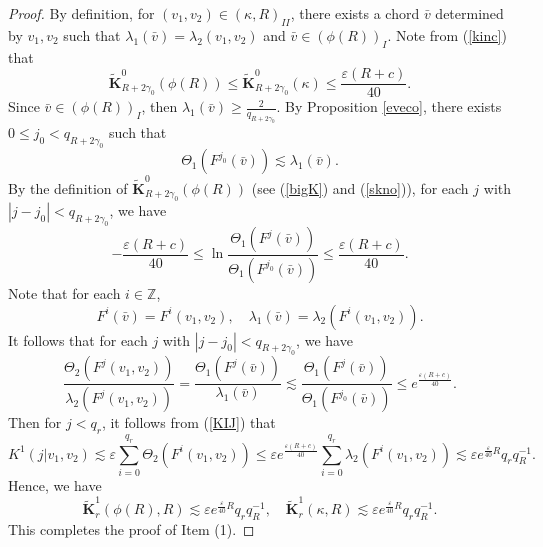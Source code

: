 \documentclass{amsart}
\theoremstyle{definition}
\begin{document}
\begin{proof}
By definition, for $(v_1,v_2)\in (\kappa,R)_{II}$, there exists a chord $\bar{v}$ determined by $v_1,v_2$ such that $\lambda_1(\bar{v})=\lambda_2(v_1,v_2)$ and $\bar{v}\in ({\phi(R)})_{I}$.  Note from (\ref{kinc}) that
\[\widetilde{\mathbf{K}}_{R+2\gamma_0}^0({\phi(R)})\leq\widetilde{\mathbf{K}}_{R+2\gamma_0}^0(\kappa)\leq \frac{\varepsilon (R+c)}{40}.\]
Since $\bar{v}\in ({\phi(R)})_{I}$, then $\lambda_1(\bar{v})\geq \frac{2}{q_{R+2\gamma_0}}$. By Proposition \ref{eveco}, there exists $0\leq j_0<q_{R+2\gamma_0}$ such that
\[\Theta_1(F^{j_0}(\bar{v}))\lesssim \lambda_1(\bar{v}).\]
By the definition of $\widetilde{\mathbf{K}}_{R+2\gamma_0}^0({\phi(R)})$ (see (\ref{bigK}) and (\ref{skno})), for each $j$ with $|j-j_0|<q_{R+2\gamma_0}$, we have
\[-\frac{\varepsilon (R+c)}{40}\leq \ln\frac{\Theta_1(F^j(\bar{v}))}{\Theta_1(F^{j_0}(\bar{v}))}\leq \frac{\varepsilon (R+c)}{40}.\]
Note that for each $i\in\mathbb{Z}$,
\[F^i(\bar{v})=F^i(v_1,v_2),\quad \lambda_1(\bar{v})=\lambda_2(F^i(v_1,v_2)).\]
It follows that for each $j$ with $|j-j_0|<q_{R+2\gamma_0}$, we have
\[\frac{\Theta_2(F^j(v_1,v_2))}{\lambda_2(F^{j}(v_1,v_2))}=\frac{\Theta_1(F^j(\bar{v}))}{\lambda_1(\bar{v})}\lesssim\frac{\Theta_1(F^j(\bar{v}))}
{\Theta_1(F^{j_0}(\bar{v}))}\leq e^{ \frac{\varepsilon (R+c)}{40}}.\]
Then for $j<q_r$, it follows from (\ref{KIJ}) that
\[K^1(j|v_1,v_2)\lesssim \varepsilon  \sum_{i=0}^{q_r}\Theta_2(F^i(v_1,v_2))\leq \varepsilon e^{ \frac{\varepsilon (R+c)}{40}}\sum_{i=0}^{q_r}\lambda_2(F^i(v_1,v_2))\lesssim \varepsilon e^{\frac{\varepsilon}{40}R}q_rq_R^{-1}.\]
Hence, we have
\begin{equation}\label{B11}
\widetilde{\mathbf{K}}_{r}^1(\phi(R),R)\lesssim \varepsilon e^{\frac{\varepsilon}{40}R}q_rq_R^{-1},\quad\widetilde{\mathbf{K}}_{r}^1(\kappa,R)\lesssim \varepsilon e^{\frac{\varepsilon}{40}R}q_rq_R^{-1}.
\end{equation}
This completes the proof of Item (1).


\end{proof}
\end{document}
